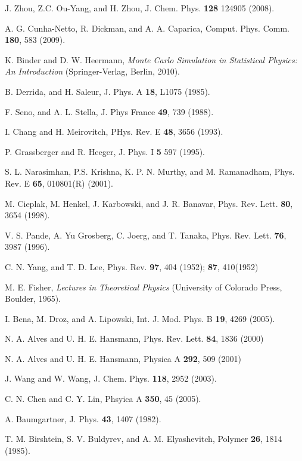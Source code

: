 \documentclass[preprint,preprintnumbers,amsmath,amssymb,showpacs,aps,pre]{revtex4-1}
\begin{document}
\begin{thebibliography}{10}
J. Zhou, Z.C. Ou-Yang, and H. Zhou, J. Chem. Phys. {\bf 128}
124905 (2008).

A. G. Cunha-Netto, R. Dickman, and A. A. Caparica, Comput. Phys. Comm.
{\bf 180}, 583 (2009).

K. Binder and D. W. Heermann, {\it Monte Carlo Simulation in
Statistical Physics: An Introduction} (Springer-Verlag, Berlin, 2010).

B. Derrida, and H. Saleur, J. Phys. A {\bf 18}, L1075 (1985).

F. Seno, and A. L. Stella, J. Phys France {\bf 49}, 739 (1988).

I. Chang and H. Meirovitch, PHys. Rev. E {\bf 48}, 3656 (1993).

P. Grassberger and R. Heeger, J. Phys. I {\bf 5} 597 (1995).

S. L. Narasimhan, P.S. Krishna, K. P. N. Murthy, and M. Ramanadham,
Phys. Rev. E {\bf 65}, 010801(R) (2001).

M. Cieplak, M. Henkel, J. Karbowski, and J. R. Banavar,
Phys. Rev. Lett. {\bf 80}, 3654 (1998).

V. S. Pande, A. Yu Grosberg, C. Joerg, and T. Tanaka,
Phys. Rev. Lett. {\bf 76}, 3987 (1996).

C. N. Yang, and T. D. Lee, Phys. Rev. {\bf 97}, 404 (1952); 
{\bf 87}, 410(1952)

M. E. Fisher, {\it Lectures in Theoretical Physics} (University of Colorado
Press, Boulder, 1965).

I. Bena, M. Droz, and A. Lipowski, Int. J. Mod. Phys. B {\bf 19},
4269 (2005).

N. A. Alves and U. H. E. Hansmann, Phys. Rev. Lett. {\bf 84}, 1836 (2000)

N. A. Alves and U. H. E. Hansmann, Physica A {\bf 292}, 509 (2001)

J. Wang and W. Wang, J. Chem. Phys. {\bf 118}, 2952 (2003).

C. N. Chen and C. Y. Lin, Phsyica A {\bf 350}, 45 (2005).

A. Baumgartner, J. Phys. {\bf 43}, 1407 (1982).

T. M. Birshtein, S. V. Buldyrev, and A. M. Elyashevitch, Polymer {\bf 26},
1814 (1985).

\end{thebibliography}
\end{document}
